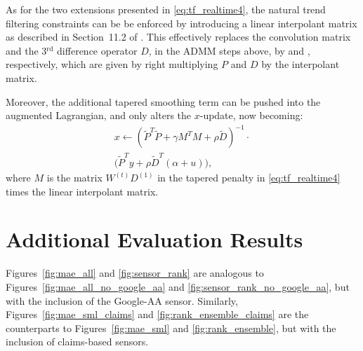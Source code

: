 \documentclass[sts]{imsart}
\def\hP{\hat{P}}
\def\tP{\tilde{P}}
\def\tD{\tilde{D}}
\def\rd{^\mathrm{rd}}
\theoremstyle{plain}
\theoremstyle{definition}
\theoremstyle{remark}
\begin{document}
\begin{appendix}
As for the two extensions presented in \eqref{eq:tf_realtime4}, the natural  
trend filtering constraints can be be enforced by introducing a linear
interpolant matrix as described in Section~11.2 of \citet{tibshirani2020divided}.
This effectively replaces the convolution matrix \smash{$\hP$} and the 3$\rd$
difference operator $D$, in the ADMM steps above, by \smash{$\tP$} and
\smash{$\tD$}, respectively, which are given by right multiplying $P$ and $D$ by
the interpolant matrix.  

Moreover, the additional tapered smoothing term can be pushed into the augmented
Lagrangian, and only alters the $x$-update, now becoming:       
\begin{multline*}
x \leftarrow (\tP^T \tP + \gamma M^T M + \rho \tD)^{-1} \cdot{} \\
 \big(\tP^T y + \rho \tD^T(\alpha + u)\big),
\end{multline*}
where $M$ is the matrix $W^{(t)} D^{(1)}$ in the tapered penalty in
\eqref{eq:tf_realtime4} times the linear interpolant matrix.

\section{Additional Evaluation Results}
\label{app:eval_plots}

Figures~\ref{fig:mae_all} and \ref{fig:sensor_rank} are analogous to
Figures~\ref{fig:mae_all_no_google_aa} and \ref{fig:sensor_rank_no_google_aa},
but with the inclusion of the Google-AA sensor. Similarly,
Figures~\ref{fig:mae_sml_claims} and \ref{fig:rank_ensemble_claims} are the
counterparts to Figures~\ref{fig:mae_sml} and \ref{fig:rank_ensemble}, but with
the inclusion of claims-based sensors.


\end{appendix}
\end{document}
